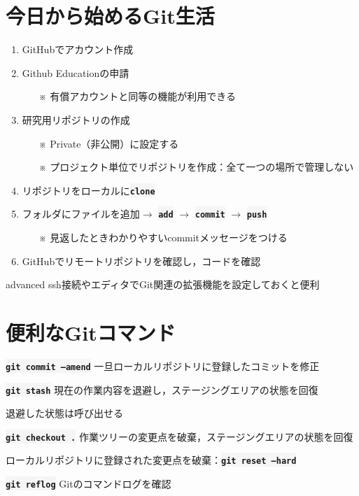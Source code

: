 \documentclass[12pt,dvipdfmx,svgnames,uplatex,aspectratio=169]{beamer}
\newcommand{\git}[1]{{\colorbox{WhiteSmoke}{\texttt{\textbf{#1}}}}}  %
\begin{document}
\section{今日から始めるGit生活}
\begin{frame}{\insertsection}
  \begin{enumerate}
    \item GitHubでアカウント作成
    \item Github Educationの申請
    \begin{itemize}
      \item[※] 有償アカウントと同等の機能が利用できる
    \end{itemize}
    \item 研究用リポジトリの作成
    \begin{itemize}
      \item[※] Private（非公開）に設定する
      \item[※] プロジェクト単位でリポジトリを作成：全て一つの場所で管理しない
    \end{itemize}
    \item リポジトリをローカルに\git{clone}
    \item フォルダにファイルを追加\(\to\) \git{add} \(\to\) \git{commit} \(\to\) \git{push}
    \begin{itemize}
      \item[※] 見返したときわかりやすいcommitメッセージをつける
    \end{itemize}
    \item GitHubでリモートリポジトリを確認し，コードを確認
  \end{enumerate}
  \begin{beamercolorbox}[rounded=true]{advanced}
    \footnotesize{
      ssh接続やエディタでGit関連の拡張機能を設定しておくと便利
      }
  \end{beamercolorbox}
\end{frame}

\section{便利なGitコマンド}
\begin{frame}{\insertsection}
  \begin{block}{\git{git commit --amend}}
    一旦ローカルリポジトリに登録したコミットを修正
  \end{block}
  \begin{block}{\git{git stash}}
    現在の作業内容を退避し，ステージングエリアの状態を回復

    退避した状態は呼び出せる
  \end{block}
  \begin{block}{\git{git checkout .}}
    作業ツリーの変更点を破棄，ステージングエリアの状態を回復

    ローカルリポジトリに登録された変更点を破棄：\git{git reset --hard}
  \end{block}
  \begin{block}{\git{git reflog}}
    Gitのコマンドログを確認
  \end{block}

\end{frame}
\end{document}
